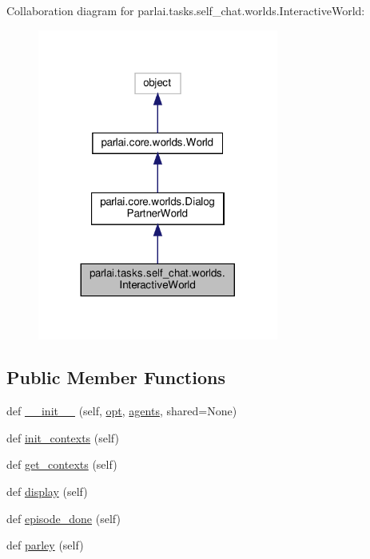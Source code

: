Collaboration diagram for parlai.\+tasks.\+self\+\_\+chat.\+worlds.\+Interactive\+World\+:
\nopagebreak
\begin{figure}[H]
\begin{center}
\leavevmode
\includegraphics[width=224pt]{df/d85/classparlai_1_1tasks_1_1self__chat_1_1worlds_1_1InteractiveWorld__coll__graph}
\end{center}
\end{figure}
\subsection*{Public Member Functions}
\begin{DoxyCompactItemize}
\item 
def \hyperlink{classparlai_1_1tasks_1_1self__chat_1_1worlds_1_1InteractiveWorld_a05a58b87b6b23a3a5c6ca1aca8ec230f}{\+\_\+\+\_\+init\+\_\+\+\_\+} (self, \hyperlink{classparlai_1_1core_1_1worlds_1_1World_a3640d92718acd3e6942a28c1ab3678bd}{opt}, \hyperlink{classparlai_1_1core_1_1worlds_1_1DialogPartnerWorld_a04185d1d55ca86c96c796f12f2226fc9}{agents}, shared=None)
\item 
def \hyperlink{classparlai_1_1tasks_1_1self__chat_1_1worlds_1_1InteractiveWorld_a79ab60d667e6e4155a375ba6fa11a946}{init\+\_\+contexts} (self)
\item 
def \hyperlink{classparlai_1_1tasks_1_1self__chat_1_1worlds_1_1InteractiveWorld_acc9ee34b52a3f17b4d7593c3eb39dd7e}{get\+\_\+contexts} (self)
\item 
def \hyperlink{classparlai_1_1tasks_1_1self__chat_1_1worlds_1_1InteractiveWorld_aa9b72efe99c4deac0224d4afcdb84ebc}{display} (self)
\item 
def \hyperlink{classparlai_1_1tasks_1_1self__chat_1_1worlds_1_1InteractiveWorld_ac5340171ef38cc918534f6315d5f4b85}{episode\+\_\+done} (self)
\item 
def \hyperlink{classparlai_1_1tasks_1_1self__chat_1_1worlds_1_1InteractiveWorld_aba09c917d6cf7c2df128a75198be1b12}{parley} (self)
\end{DoxyCompactItemize}
